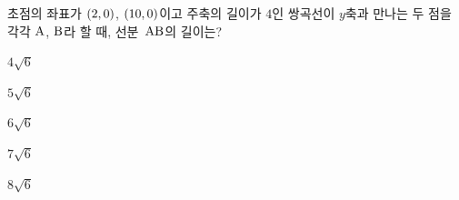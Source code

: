 초점의 좌표가 $(2{,}\mkern3mu\mathopen{}0)$, $(10{,}\mkern3mu\mathopen{}0)$이고 주축의 길이가 $4$인 쌍곡선이 $y$축과 만나는 두 점을 각각 $\mathrm{A}$, $\mathrm{B}$라 할 때, 선분~$\mathrm{AB}$의 길이는?
\begin{choices32}{\rule[-3ex]{0pt}{8ex}$4\sqrt{6}$}{\rule[-3ex]{0pt}{8ex}$5\sqrt{6}$}{\rule[-3ex]{0pt}{8ex}$6\sqrt{6}$}{\rule[-3ex]{0pt}{8ex}$7\sqrt{6}$}{\rule[-3ex]{0pt}{8ex}$8\sqrt{6}$}\end{choices32}
